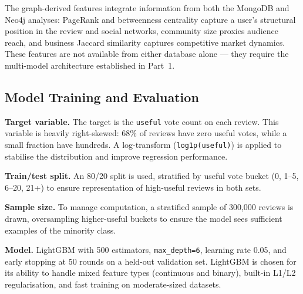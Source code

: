 \documentclass[11pt]{article}
\begin{document}
The graph-derived features integrate information from both the MongoDB and Neo4j analyses: PageRank and betweenness centrality capture a user's structural position in the review and social networks, community size proxies audience reach, and business Jaccard similarity captures competitive market dynamics. These features are not available from either database alone --- they require the multi-model architecture established in Part~1.

\subsection{Model Training and Evaluation}

\textbf{Target variable.} The target is the \texttt{useful} vote count on each review. This variable is heavily right-skewed: 68\% of reviews have zero useful votes, while a small fraction have hundreds. A log-transform (\texttt{log1p(useful)}) is applied to stabilise the distribution and improve regression performance.

\textbf{Train/test split.} An 80/20 split is used, stratified by useful vote bucket (0, 1--5, 6--20, 21+) to ensure representation of high-useful reviews in both sets.

\textbf{Sample size.} To manage computation, a stratified sample of 300,000 reviews is drawn, oversampling higher-useful buckets to ensure the model sees sufficient examples of the minority class.

\textbf{Model.} LightGBM with 500 estimators, \texttt{max\_depth=6}, learning rate 0.05, and early stopping at 50 rounds on a held-out validation set. LightGBM is chosen for its ability to handle mixed feature types (continuous and binary), built-in L1/L2 regularisation, and fast training on moderate-sized datasets.
\end{document}
